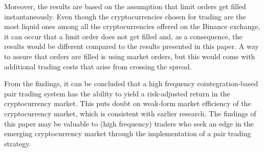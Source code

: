 \documentclass[12pt,english,authoryear]{article}
\begin{document}
Moreover, the results are based on the assumption that limit orders get filled instantaneously. Even though the cryptocurrencies chosen for trading are the most liquid ones among all the cryptocurrencies offered on the Binance exchange, it can occur that a limit order does not get filled and, as a consequence, the results would be different compared to the results presented in this paper. A way to assure that orders are filled is using market orders, but this would come with additional trading costs that arise from crossing the spread. 
 
From the findings, it can be concluded that a high frequency cointegration-based pair trading system has the ability to yield a risk-adjusted return in the cryptocurrency market. This puts doubt on weak-form market efficiency of the cryptocurrency market, which is consistent with earlier research. The findings of this paper may be valuable to (high frequency) traders who seek an edge in the emerging cryptocurrency market through the implementation of a pair trading strategy.



\end{document}
